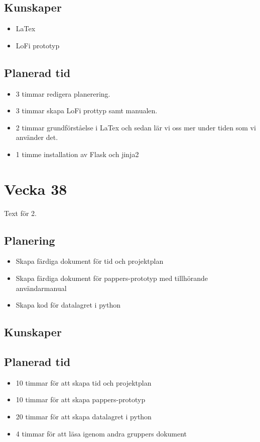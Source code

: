 \documentclass{TDP003mall}
\begin{document}
\subsection{Kunskaper}
\begin{itemize}
\item LaTex
\item LoFi prototyp
\end{itemize}

\subsection{Planerad tid}
\begin{itemize}
\item 3 timmar redigera planerering. 
\item 3 timmar skapa LoFi prottyp samt manualen. 
\item 2 timmar grundförståelse i LaTex och sedan lär vi oss mer under tiden som vi använder det. 
\item 1 timme  installation av Flask och jinja2
\end{itemize}

\section{Vecka 38}
Text för 2.

\subsection{Planering}
\begin{itemize}
\item Skapa färdiga dokument för tid och projektplan
\item Skapa färdiga dokument för pappers-prototyp med tillhörande användarmanual 
\item Skapa kod för datalagret i python
\end{itemize}


\subsection{Kunskaper}

\subsection{Planerad tid}
\begin{itemize}
\item 10 timmar för att skapa tid och projektplan
\item 10 timmar för att skapa pappers-prototyp
\item 20 timmar för att skapa datalagret i python  
\item  4 timmar för att läsa igenom andra gruppers dokument
\end{itemize}
\end{document}
